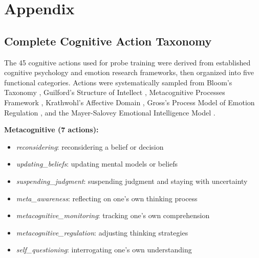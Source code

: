 \documentclass{article}
\begin{document}


\appendix

\section{Appendix}

\subsection{Complete Cognitive Action Taxonomy}

The 45 cognitive actions used for probe training were derived from established cognitive psychology and emotion research frameworks, then organized into five functional categories. Actions were systematically sampled from Bloom's Taxonomy \cite{Anderson2001}, Guilford's Structure of Intellect \cite{Guilford1967}, Metacognitive Processes Framework \cite{Flavell1979}, Krathwohl's Affective Domain \cite{Krathwohl1964}, Gross's Process Model of Emotion Regulation \cite{Gross1998}, and the Mayer-Salovey Emotional Intelligence Model \cite{MayerSalovey1997}.

\textbf{Metacognitive (7 actions):}
\begin{itemize}
    \item \textit{reconsidering}: reconsidering a belief or decision
    \item \textit{updating\_beliefs}: updating mental models or beliefs
    \item \textit{suspending\_judgment}: suspending judgment and staying with uncertainty
    \item \textit{meta\_awareness}: reflecting on one's own thinking process
    \item \textit{metacognitive\_monitoring}: tracking one's own comprehension
    \item \textit{metacognitive\_regulation}: adjusting thinking strategies
    \item \textit{self\_questioning}: interrogating one's own understanding
\end{itemize}
\end{document}
